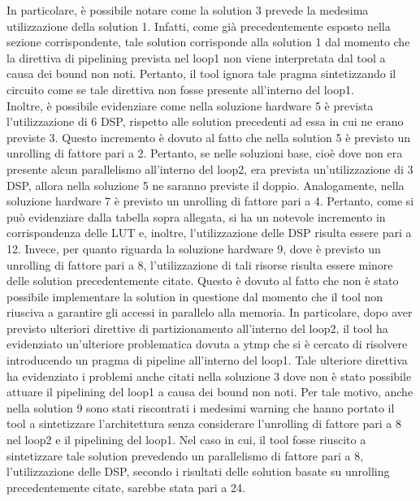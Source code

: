 In particolare, è possibile notare come la solution 3 prevede la medesima utilizzazione della solution 1. Infatti, come già precedentemente esposto nella sezione corrispondente, tale solution corrisponde alla solution 1 dal momento che la direttiva di pipelining prevista nel loop1 non viene interpretata dal tool a causa dei bound non noti. Pertanto, il tool ignora tale pragma sintetizzando il circuito come se tale direttiva non fosse presente all'interno del loop1. 
\\
Inoltre, è possibile evidenziare come nella soluzione hardware 5 è prevista l'utilizzazione di 6 DSP, rispetto alle solution precedenti ad essa in cui ne erano previste 3. Questo incremento è dovuto al fatto che nella solution 5 è previsto un unrolling di fattore pari a 2. Pertanto, se nelle soluzioni base, cioè dove non era presente alcun parallelismo all'interno del loop2, era prevista un'utilizzazione di 3 DSP, allora nella soluzione 5 ne saranno previste il doppio. Analogamente, nella soluzione hardware 7 è previsto un unrolling di fattore pari a 4. Pertanto, come si può evidenziare dalla tabella sopra allegata, si ha un notevole incremento in corrispondenza delle LUT e, inoltre, l'utilizzazione delle DSP risulta essere pari a 12. Invece, per quanto riguarda la soluzione hardware 9, dove è previsto un unrolling di fattore pari a 8, l'utilizzazione di tali risorse risulta essere minore delle solution precedentemente citate. Questo è dovuto al fatto che non è stato possibile implementare la solution in questione dal momento che il tool non riusciva a garantire gli accessi in parallelo alla memoria. In particolare, dopo aver previsto ulteriori direttive di partizionamento all'interno del loop2, il tool ha evidenziato un'ulteriore problematica dovuta a ytmp che si è cercato di risolvere introducendo un pragma di pipeline all'interno del loop1. Tale ulteriore direttiva ha evidenziato i problemi anche citati nella soluzione 3 dove non è stato possibile attuare il pipelining del loop1 a causa dei bound non noti. Per tale motivo, anche nella solution 9 sono stati riscontrati i medesimi warning che hanno portato il tool a sintetizzare l'architettura senza considerare l'unrolling di fattore pari a 8 nel loop2 e il pipelining del loop1. Nel caso in cui, il tool fosse riuscito a sintetizzare tale solution prevedendo un parallelismo di fattore pari a 8, l'utilizzazione delle DSP, secondo i risultati delle solution basate su unrolling precedentemente citate, sarebbe stata pari a 24.
\\
